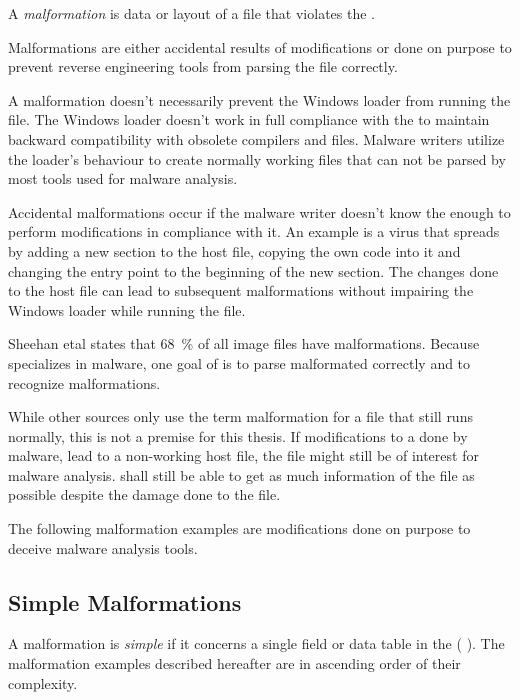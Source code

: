 \begin{definition}[Malformation]
A \emph{malformation} is data or layout of a \PE{} file that violates the \PECOFF{}.
\end{definition} 

Malformations are either accidental results of \PE{} modifications or done on purpose to prevent reverse engineering tools from parsing the file correctly.

A malformation doesn't necessarily prevent the Windows loader from running the file. The Windows loader doesn't work in full compliance with the \PECOFF{} to maintain backward compatibility with obsolete compilers and files. Malware writers utilize the loader's behaviour to create normally working \PE{} files that can not be parsed by most tools used for malware analysis. 

Accidental malformations occur if the malware writer doesn't know the \PECOFF{} enough to perform modifications in compliance with it. An example is a virus that spreads by adding a new section to the host file, copying the own code into it and changing the entry point to the beginning of the new section. The changes done to the host file can lead to subsequent malformations without impairing the Windows loader while running the file.

Sheehan et\thinspace{}al states that 68~\% of all image files have malformations. \cite[slide 7]{sheehan07}
Because \portex{} specializes in \PE{} malware, one goal of \portex{} is to parse malformated  correctly and to recognize malformations.

While other sources only use the term malformation for a file that still runs normally, this is not a premise for this thesis. If modifications to a \PE{} done by malware, lead to a non-working host file, the file might still be of interest for malware analysis. \portex{} shall still be able to get as much information of the file as possible despite the damage done to the file. 

The following malformation examples are modifications done on purpose to deceive malware analysis tools.

\subsection{Simple Malformations}

A malformation is \emph{simple} if it concerns a single field or data table in the \PE{} (\cf{} \cite[slide 7]{vuksan11}).
The malformation examples described hereafter are in ascending order of their complexity. 

